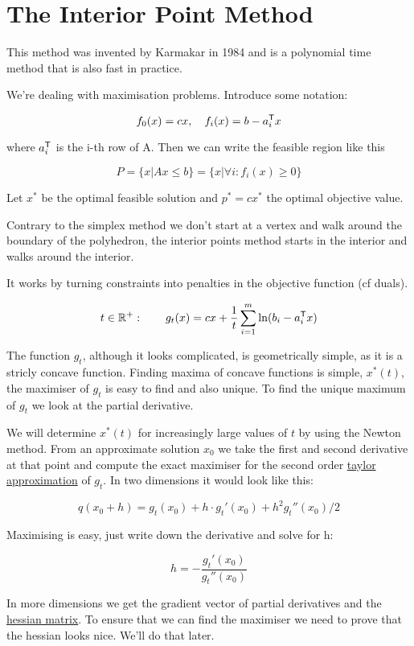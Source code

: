 \section{The Interior Point Method}

This method was invented by Karmakar in 1984 and is a polynomial time method that is also fast in practice.

We're dealing with maximisation problems. Introduce some notation:

\[f_0(x) = cx,\quad f_i(x)=b-{a}^\text{\upshape \sffamily T}_i x\]

where ${a}^\text{\upshape \sffamily T}_i$ is the i-th row of A. Then we can write the feasible region like this

\[P=\{x|Ax\leq b\}=\{x|\forall i:f_i(x)\geq 0\}\]

Let $x^*$ be the optimal feasible solution and $p^*=cx^*$ the optimal objective value. 

Contrary to the simplex method we don't start at a vertex and walk around the boundary of the polyhedron, the interior points method starts in the interior and walks around the interior.

It works by turning constraints into penalties in the objective function (cf duals). 

\[t\in \mathbb{R}^+:\qquad g_t(x)=cx+\frac 1t \sum_{i=1}^m\ln (b_i-{a}^\text{\upshape \sffamily T}_i x)\]

The function $g_t$, although it looks complicated, is geometrically simple, as it is a stricly concave function. Finding maxima of concave functions is simple, $x^*(t)$, the maximiser of $g_t$ is easy to find and also unique. To find the unique maximum of $g_t$ we look at the partial derivative.

We will determine $x^*(t)$ for increasingly large values of $t$ by using the Newton method. From an approximate solution $x_0$ we take the first and second derivative at that point and compute the exact maximiser for the second order \href{http://en.wikipedia.org/wiki/Taylor\_expansion}{taylor approximation} of $g_t$. In two dimensions it would look like this:

\[q(x_0+h) = g_t(x_0) + h \cdot g_t'(x_0) + h^2 g_t''(x_0)/2\]

Maximising is easy, just write down the derivative and solve for h:

\[h = - \frac{g_t'(x_0)}{g_t''(x_0)} \]

In more dimensions we get the gradient vector of partial derivatives and the \href{http://en.wikipedia.org/wiki/Hessian\_matrix}{hessian matrix}. To ensure that we can find the maximiser we need to prove that the hessian looks nice. We'll do that later.

